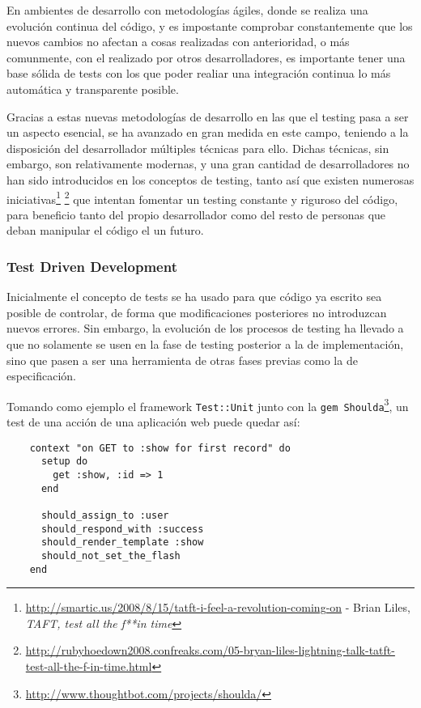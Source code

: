 En ambientes de desarrollo con metodologías ágiles, donde se realiza una evolución continua del código, y es impostante comprobar constantemente que los nuevos cambios no afectan a cosas realizadas con anterioridad, o más comunmente, con el realizado por otros desarrolladores, es importante tener una base sólida de tests con los que poder realiar una integración continua lo más automática y transparente posible.

Gracias a estas nuevas metodologías de desarrollo en las que el testing pasa a ser un aspecto esencial, se ha avanzado en gran medida en este campo, teniendo a la disposición del desarrollador múltiples técnicas para ello. Dichas técnicas, sin embargo, son relativamente modernas, y una gran cantidad de desarrolladores no han sido introducidos en los conceptos de testing, tanto así que existen numerosas iniciativas\footnote{\url{http://smartic.us/2008/8/15/tatft-i-feel-a-revolution-coming-on} - Brian Liles, \emph{TAFT, test all the f**in time}} \footnote{\url{http://rubyhoedown2008.confreaks.com/05-bryan-liles-lightning-talk-tatft-test-all-the-f-in-time.html}} que intentan fomentar un testing constante y riguroso del código, para beneficio tanto del propio desarrollador como del resto de personas que deban manipular el código el un futuro. 

\subsubsection{Test Driven Development} %
\label{ssub:test_driven_development}

Inicialmente el concepto de tests se ha usado para que código ya escrito sea posible de controlar, de forma que modificaciones posteriores no introduzcan nuevos errores. Sin embargo, la evolución de los procesos de testing ha llevado a que no solamente se usen en la fase de testing posterior a la de implementación, sino que pasen a ser una herramienta de otras fases previas como la de especificación.

Tomando como ejemplo el framework \texttt{Test::Unit} junto con la \texttt{gem Shoulda}\footnote{\url{http://www.thoughtbot.com/projects/shoulda/}}, un test de una acción de una aplicación web puede quedar así:

\begin{verbatim}
	context "on GET to :show for first record" do
	  setup do
	    get :show, :id => 1
	  end

	  should_assign_to :user
	  should_respond_with :success
	  should_render_template :show
	  should_not_set_the_flash
	end
\end{verbatim}

